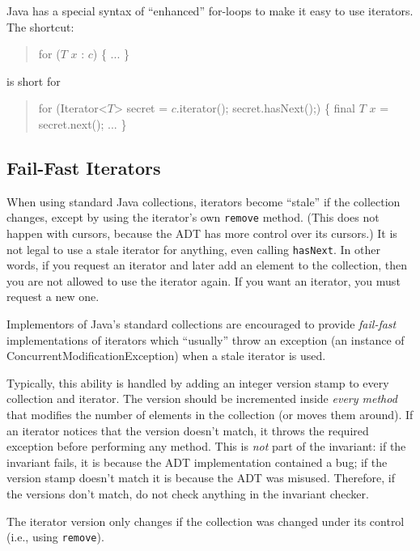 \documentclass[11pt]{article}
\begin{document}
Java has a special syntax of ``enhanced'' for-loops to make it easy to use
iterators.  The shortcut:
\begin{quote}
\begin{program}
for ($T$ $x$ : $c$) \{
   ...
\}
\end{program}
\end{quote}
is short for
\begin{quote}
\begin{program}
for (Iterator<$T$> secret = $c$.iterator(); secret.hasNext();) \{
   final $T$ $x$ = secret.next();
   ...
\}
\end{program}
\end{quote}

\subsection{Fail-Fast Iterators}

When using standard Java collections,
iterators become ``stale'' if the collection changes, except by using
the iterator's own \verb|remove| method.  (This does not happen with
cursors, because the ADT has more control over its cursors.)
It is not legal to
use a stale iterator for anything, even calling \verb|hasNext|.
In other words, if you request an iterator and later add an element to
the collection, then you are not allowed to use the iterator again.
If you want an iterator, you must request a new one.

Implementors of Java's standard 
collections are encouraged to provide \emph{fail-fast}
implementations of iterators which ``usually'' throw an exception
(an instance of \textsf{ConcurrentModificationException})
when a stale iterator is used.

Typically, this ability is handled by adding an integer version stamp to every
collection and iterator.  The version should be incremented inside \emph{every method} that
modifies the number of elements in the collection (or moves them around).  If an iterator
notices that the version doesn't 
match, it throws the required exception before performing any method.
This is \emph{not} part of the invariant: if the invariant fails, it
is because the ADT implementation contained a bug; if the version stamp doesn't match it
is because the ADT was misused. Therefore, if the versions don't
match, do not check anything in the invariant checker.

The iterator version only changes if the collection was changed under
its control (i.e., using \verb|remove|).
\end{document}
